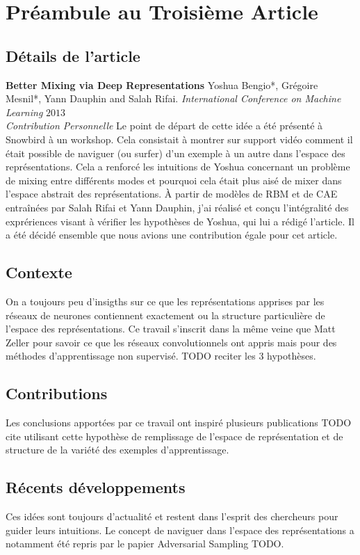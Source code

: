\chapter{Pr\'{e}ambule au Troisi\`{e}me Article }

\section{D\'{e}tails de l'article}

{\bf Better Mixing via Deep Representations} Yoshua Bengio*, Grégoire Mesnil*, Yann Dauphin and Salah Rifai. {\it International Conference on Machine Learning} $2013$\\

{\it Contribution Personnelle} Le point de départ de cette idée a été présenté
à Snowbird à un workshop. Cela consistait à montrer sur support vidéo comment
il était possible de naviguer (ou surfer) d'un exemple à un autre dans l'espace
des représentations. Cela a renforcé les intuitions de Yoshua concernant un
problème de mixing entre différents modes et pourquoi cela était plus aisé de
mixer dans l'espace abstrait des représentations. À partir de modèles de RBM et
de CAE entraînées par Salah Rifai et Yann Dauphin, j'ai réalisé et conçu
l'intégralité des exprériences visant à vérifier les hypothèses de Yoshua, qui
lui a rédigé l'article. Il a été décidé ensemble que nous avions une
contribution égale pour cet article.

\section{Contexte}

On a toujours peu d'insigths sur ce que les représentations apprises par les
réseaux de neurones contiennent exactement ou la structure particulière de
l'espace des représentations. Ce travail s'inscrit dans la même veine que Matt
Zeller pour savoir ce que les réseaux convolutionnels ont appris mais pour des
méthodes d'apprentissage non supervisé. TODO reciter les 3 hypothèses.

\section{Contributions}

Les conclusions apportées par ce travail ont inspiré plusieurs publications
TODO cite utilisant cette hypothèse de remplissage de l'espace de représentation et de
structure de la variété des exemples d'apprentissage.

\section{R\'{e}cents d\'{e}veloppements}

Ces idées sont toujours d'actualité et restent dans l'esprit des chercheurs
pour guider leurs intuitions. Le concept de naviguer dans l'espace des
représentations a notamment été repris par le papier Adversarial Sampling TODO.
